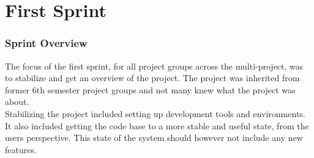 \part{First Sprint}
\label{par:first_sprint}

\section{Sprint Overview}
The focus of the first sprint, for all project groups across the multi-project, was to stabilize and get an overview of the project. The project was inherited from former 6th semester project groups and not many knew what the \giraf project was about.
\\
Stabilizing the project included setting up development tools and environments. It also included getting the code base to a more stable and useful state, from the users perspective. This state of the system should however not include any new features.



